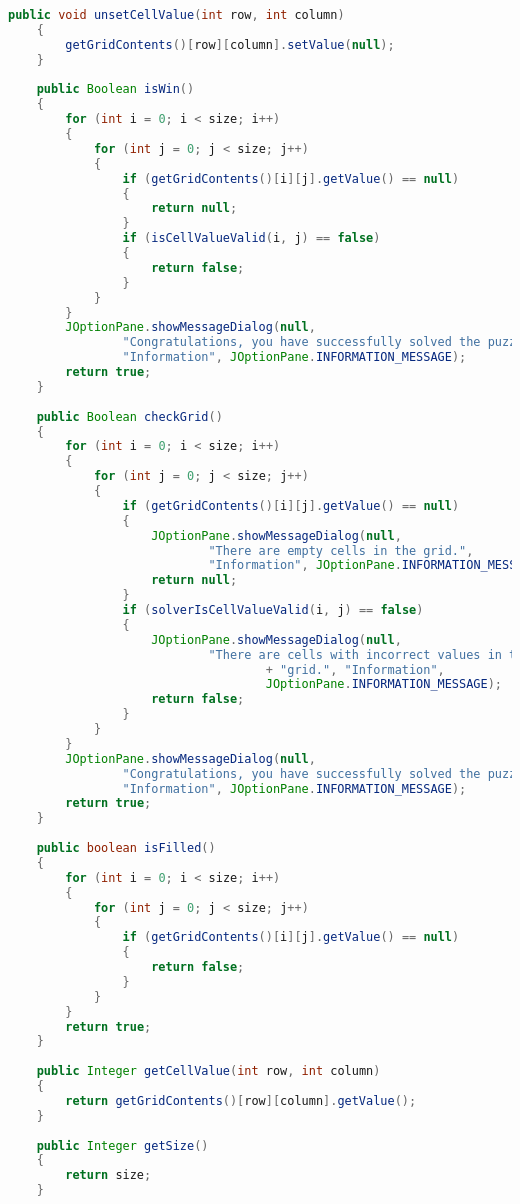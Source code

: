 \begin{lstlisting}[language=Java,basicstyle=\tiny,caption=Grid.java]
    public void unsetCellValue(int row, int column)
    {
        getGridContents()[row][column].setValue(null);
    }
    
    public Boolean isWin()
    {
        for (int i = 0; i < size; i++)
        {
            for (int j = 0; j < size; j++)
            {
                if (getGridContents()[i][j].getValue() == null)
                {
                    return null;
                }
                if (isCellValueValid(i, j) == false)
                {
                    return false;
                }
            }
        }
        JOptionPane.showMessageDialog(null, 
                "Congratulations, you have successfully solved the puzzle!", 
                "Information", JOptionPane.INFORMATION_MESSAGE);
        return true;
    }
    
    public Boolean checkGrid()
    {
        for (int i = 0; i < size; i++)
        {
            for (int j = 0; j < size; j++)
            {
                if (getGridContents()[i][j].getValue() == null)
                {
                    JOptionPane.showMessageDialog(null, 
                            "There are empty cells in the grid.", 
                            "Information", JOptionPane.INFORMATION_MESSAGE);
                    return null;
                }
                if (solverIsCellValueValid(i, j) == false)
                {
                    JOptionPane.showMessageDialog(null,
                            "There are cells with incorrect values in the " 
                                    + "grid.", "Information", 
                                    JOptionPane.INFORMATION_MESSAGE);
                    return false;
                }
            }
        }
        JOptionPane.showMessageDialog(null, 
                "Congratulations, you have successfully solved the puzzle!", 
                "Information", JOptionPane.INFORMATION_MESSAGE);
        return true;
    }
    
    public boolean isFilled()
    {
        for (int i = 0; i < size; i++)
        {
            for (int j = 0; j < size; j++)
            {
                if (getGridContents()[i][j].getValue() == null)
                {
                    return false;
                }
            }
        }
        return true;
    }
    
    public Integer getCellValue(int row, int column)
    {
        return getGridContents()[row][column].getValue();
    }
        
    public Integer getSize()
    {
        return size;
    }
    

\end{lstlisting}
